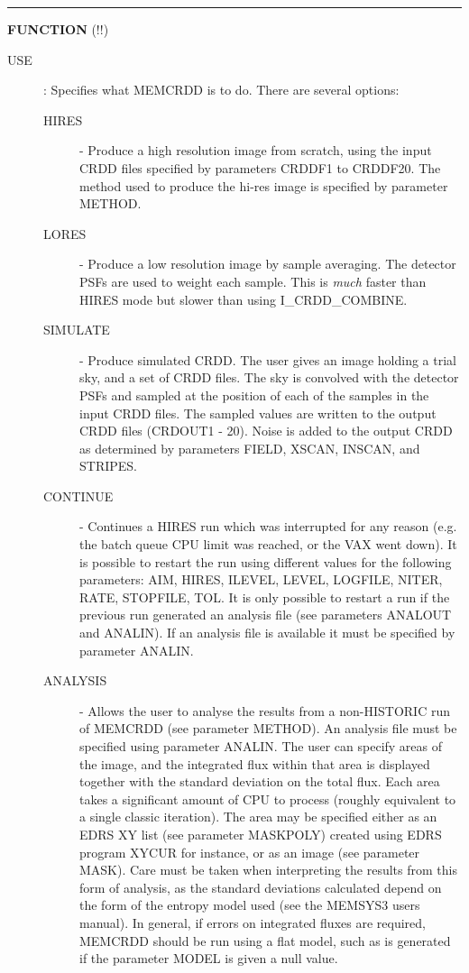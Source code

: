 \rule{\textwidth}{0.3mm}
{\Large {\bf FUNCTION} (!!)}
\begin{description}
\item [USE]:
Specifies what MEMCRDD is to do. There are several options:
\begin{description}
\item [HIRES] - Produce a high resolution image from scratch, using the 
input CRDD files specified by parameters CRDDF1 to CRDDF20. 
The method used to produce the hi-res image is specified by parameter METHOD.
\item [LORES] - Produce a low resolution image by sample averaging. The detector 
PSFs are used to weight each sample. This is {\em much} faster than HIRES mode
but slower than using I\_CRDD\_COMBINE.
\item [SIMULATE] - Produce simulated CRDD. The user gives an image holding a 
trial sky, and a set of CRDD files. The sky is convolved with the detector
PSFs and sampled at the position of each of the samples in the input CRDD files.
The sampled values are written to the output CRDD files (CRDOUT1 - 20). Noise
is added to the output CRDD as determined by parameters FIELD, XSCAN, INSCAN, 
and STRIPES.
\item [CONTINUE] - Continues a HIRES run which was interrupted for any reason 
(e.g. the batch queue CPU limit was reached, or the VAX went down). It is 
possible to restart the run using different values for the following parameters:
AIM, HIRES, ILEVEL, LEVEL, LOGFILE, NITER, RATE, STOPFILE, TOL. It is 
only possible to restart a run if the previous run generated an analysis file 
(see parameters ANALOUT and ANALIN). If an analysis file is available it must be 
specified by parameter ANALIN.
\item [ANALYSIS] - Allows the user to analyse the results from a non-HISTORIC run 
of MEMCRDD (see parameter METHOD). An analysis file must be specified using 
parameter ANALIN. The user can specify areas of the image, and the integrated 
flux within that area is displayed together with the standard deviation on the 
total flux. Each area takes a significant amount of CPU to process (roughly
equivalent to a single classic iteration). The area may be specified either as
an EDRS XY list (see parameter MASKPOLY) created using EDRS program XYCUR 
for instance, or as an image (see parameter MASK). Care must be taken when 
interpreting the results from this form of analysis, as the standard deviations 
calculated depend on the form of the entropy model used (see the MEMSYS3 users
manual). In general, if errors on integrated fluxes are required, MEMCRDD should
be run using a flat model, such as is generated if the parameter MODEL is given 
a null value.


\end{description}
\end{description}
